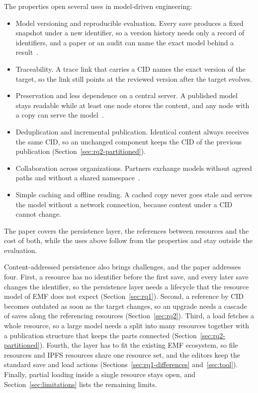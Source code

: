 \documentclass[iicol,pdflatex,sn-mathphys-num]{sn-jnl}
\theoremstyle{thmstylethree}%
\begin{document}
The properties open several uses in model-driven engineering:
\begin{itemize}
\item Model versioning and reproducible evaluation. Every save produces a fixed snapshot under a new identifier, so a version history needs only a record of identifiers, and a paper or an audit can name the exact model behind a result~\cite{koegel2010emfstore,lamb2022reproducible}.
\item Traceability. A trace link that carries a CID names the exact version of the target, so the link still points at the reviewed version after the target evolves.
\item Preservation and less dependence on a central server. A published model stays readable while at least one node stores the content, and any node with a copy can serve the model~\cite{dicosmo2017heritage,kelly2016wayback}.
\item Deduplication and incremental publication. Identical content always receives the same CID, so an unchanged component keeps the CID of the previous publication (Section~\ref{sec:rq2-partitioned}).
\item Collaboration across organizations. Partners exchange models without agreed paths and without a shared namespace~\cite{dirocco2015repositories,franzago2018collaborative}.
\item Simple caching and offline reading. A cached copy never goes stale and serves the model without a network connection, because content under a CID cannot change.
\end{itemize}
The paper covers the persistence layer, the references between resources and the cost of both, while the uses above follow from the properties and stay outside the evaluation.

Content-addressed persistence also brings challenges, and the paper addresses four. First, a resource has no identifier before the first save, and every later save changes the identifier, so the persistence layer needs a lifecycle that the resource model of EMF does not expect (Section~\ref{sec:rq1}). Second, a reference by CID becomes outdated as soon as the target changes, so an upgrade needs a cascade of saves along the referencing resources (Section~\ref{sec:rq2}). Third, a load fetches a whole resource, so a large model needs a split into many resources together with a publication structure that keeps the parts connected (Section~\ref{sec:rq2-partitioned}). Fourth, the layer has to fit the existing EMF ecosystem, so file resources and IPFS resources share one resource set, and the editors keep the standard save and load actions (Sections~\ref{sec:rq1-differences} and~\ref{sec:tool}). Finally, partial loading inside a single resource stays open, and Section~\ref{sec:limitations} lists the remaining limits.
\end{document}
